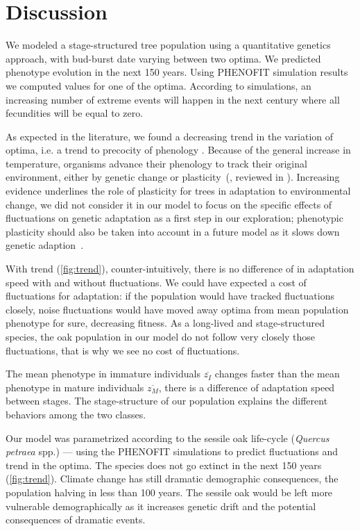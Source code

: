 \label{sec:Disc}
\section*{Discussion}

We modeled a stage-structured tree population using a quantitative genetics approach, with bud-burst date varying between two optima. We predicted phenotype evolution in the next 150 years. Using \textsc{PHENOFIT} simulation results we computed values for one of the optima. According to simulations, an increasing number of extreme events will happen in the next century where all fecundities will be equal to zero.

As expected in the literature, we found a decreasing trend in the variation of optima, i.e. a trend to precocity of phenology \citep{aitken_adaptation_2008, ehrlen_timing_2009}. Because of the general increase in temperature, organisms advance their phenology to track their original environment, either by genetic change or plasticity~(\citealt{savolainen_genetic_2004}, reviewed in \citealt{merila_climate_2014}). Increasing evidence underlines the role of plasticity for trees in adaptation to environmental change, we did not consider it in our model to focus on the specific effects of fluctuations on genetic adaptation as a first step in our exploration; phenotypic plasticity should also be taken into account in a future model as it slows down genetic adaption~\citep{alberto_potential_2013, aitken_adaptation_2008}. 

With trend (\autoref{fig:trend}), counter-intuitively, there is no difference of in adaptation speed with and without fluctuations. We could have expected a cost of fluctuations for adaptation: if the population would have tracked fluctuations closely, noise fluctuations would have moved away optima from mean population phenotype for sure, decreasing fitness. As a long-lived and stage-structured species, the oak population in our model do not follow very closely those fluctuations, that is why we see no cost of fluctuations.

The mean phenotype in immature individuals $\overline{z_I}$ changes faster than the mean phenotype in mature individuals $\overline{z_M}$, there is a difference of adaptation speed between stages. The stage-structure of our population explains the different behaviors among the two classes. 

Our model was parametrized according to the sessile oak life-cycle (\textit{Quercus petraea} spp.) — using the \textsc{PHENOFIT} simulations to predict fluctuations and trend in the optima. The species does not go extinct in the next 150 years (\autoref{fig:trend}). Climate change has still dramatic demographic consequences, the population halving in less than 100 years. The sessile oak would be left more vulnerable demographically as it increases genetic drift and the potential consequences of dramatic events.

